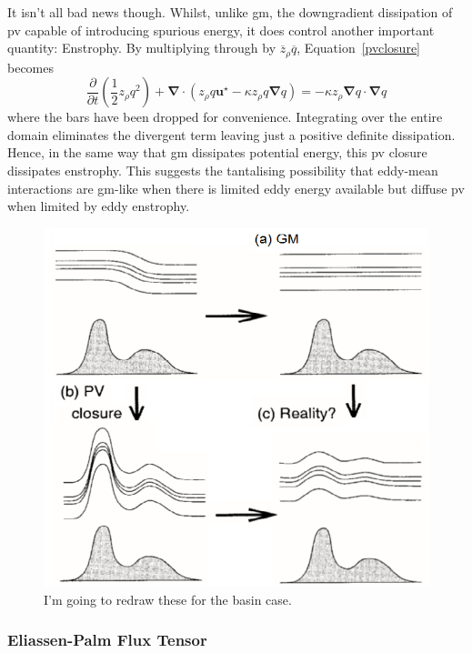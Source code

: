 \documentclass[10pt,a4paper]{report}
\newcommand*\mean[1]{\overline{#1}}
\newcommand*\equref[1]{Equation~\eqref{#1}}
\newcommand*{\half}{\frac{1}{2}}
\begin{document}
                It isn't all bad news though. Whilst, unlike \gls{gm}, the downgradient
                dissipation of \gls{pv} capable of introducing spurious energy, it does
                control another important quantity: Enstrophy. By multiplying through 
                by $\mean{z}_{\rho} \mean{q}$, \equref{pvclosure} becomes 
                \begin{equation}
                \frac{\partial  }{\partial t}\left(\half z_{\rho}q^{2}\right) + \boldsymbol{\nabla}\cdot\left(z_{\rho}q\boldsymbol{u}^\star-\kappa z_{\rho}q\boldsymbol{\nabla} q
                \right)=-\kappa z_\rho \boldsymbol{\nabla}q\cdot\boldsymbol{\nabla}q
                \end{equation}
                where the bars have been dropped for convenience.
                Integrating over the entire domain eliminates the divergent term
                leaving just a positive definite dissipation.
                Hence, in the same way that \gls{gm} dissipates potential energy, this
                \gls{pv} closure dissipates enstrophy. This suggests the tantalising
                possibility that eddy-mean interactions are \gls{gm}-like when
                there is limited eddy energy available but diffuse \gls{pv} when
                limited by eddy enstrophy.
                
                \begin{figure}
                	\centering
                	\includegraphics[width=0.6\linewidth]{am00}
                	\caption[Cold-doming]{I'm going to redraw these for the basin case.}
                	\label{fig:Colddoming}
                \end{figure}
                
                
                
                \subsubsection{Eliassen-Palm Flux Tensor}
                
\end{document}
